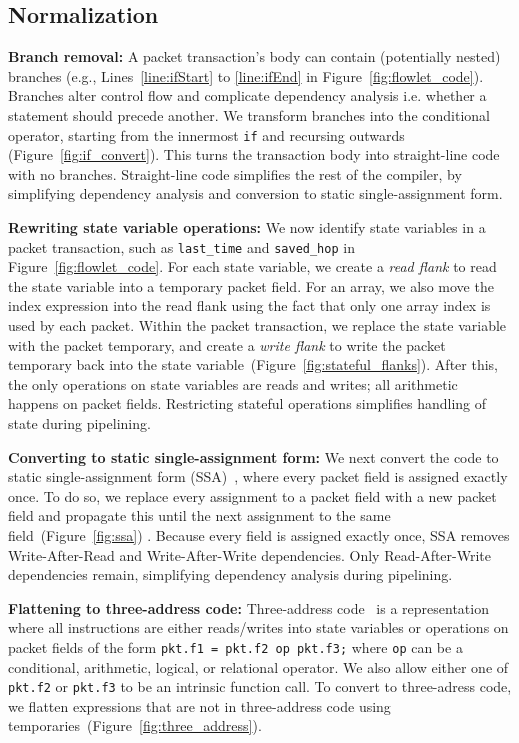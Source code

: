 \subsection{Normalization}
\label{ss:normalization}

\textbf{Branch removal: }A packet transaction's body can contain (potentially
nested) branches (e.g., Lines~\ref{line:ifStart} to \ref{line:ifEnd} in
Figure~\ref{fig:flowlet_code}).  Branches alter control flow and complicate
dependency analysis i.e.  whether a statement should precede another.  We
transform branches into the conditional operator, starting from the innermost
\texttt{if} and recursing outwards (Figure~\ref{fig:if_convert}).  This turns
the transaction body into straight-line code with no branches.  Straight-line
code simplifies the rest of the compiler, by simplifying dependency analysis
and conversion to static single-assignment form.

\textbf{Rewriting state variable operations: }We now identify state variables
in a packet transaction, such as \texttt{last\_time} and \texttt{saved\_hop} in
Figure~\ref{fig:flowlet_code}.  For each state variable, we create a
\textit{read flank} to read the state variable into a temporary packet field.
For an array, we also move the index expression into the read flank using the
fact that only one array index is used by each packet.  Within the packet
transaction, we replace the state variable with the packet temporary, and
create a \textit{write flank} to write the packet temporary back into the state
variable~(Figure~\ref{fig:stateful_flanks}). After this, the only operations
on state variables are reads and writes; all arithmetic happens on packet
fields. Restricting stateful operations simplifies handling of state during
pipelining.

\textbf{Converting to static single-assignment form: }We next convert the code to
static single-assignment form (SSA)~\cite{ssa}, where every packet field is
assigned exactly once. To do so, we replace every assignment to a packet field
with a new packet field and propagate this until the next assignment to the
same field~(Figure~\ref{fig:ssa}) .  Because every field is assigned exactly
once, SSA removes Write-After-Read and Write-After-Write dependencies.  Only
Read-After-Write dependencies remain, simplifying dependency analysis during
pipelining.

\textbf{Flattening to three-address code: } Three-address code~\cite{tac} is a
representation where all instructions are either reads/writes into state
variables or operations on packet fields of the form \texttt{pkt.f1 = pkt.f2 op
pkt.f3;} where \texttt{op} can be a conditional, arithmetic, logical, or
relational operator.  We also allow either one of {\tt pkt.f2} or {\tt pkt.f3}
to be an intrinsic function call.  To convert to three-adress code, we flatten
expressions that are not in three-address code using
temporaries~(Figure~\ref{fig:three_address}).

